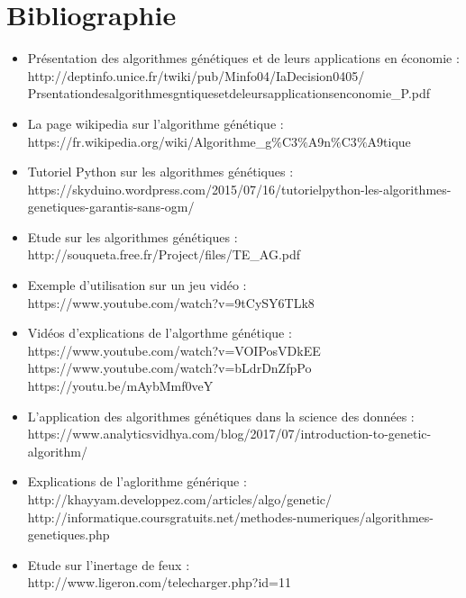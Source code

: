 \documentclass[a4paper,11pt]{article}
\begin{document}
	\section{Bibliographie}
	\begin{itemize}
		\item Présentation des algorithmes génétiques et de leurs applications en économie :\\
		http://deptinfo.unice.fr/twiki/pub/Minfo04/IaDecision0405/ \\
		Prsentationdesalgorithmesgntiquesetdeleursapplicationsenconomie\_P.pdf
		\item La page wikipedia sur l'algorithme génétique : \\
		https://fr.wikipedia.org/wiki/Algorithme\_g$\%$C3$\%$A9n$\%$C3$\%$A9tique

		\item Tutoriel Python sur les algorithmes génétiques :\\
		https://skyduino.wordpress.com/2015/07/16/tutorielpython-les-algorithmes-genetiques-garantis-sans-ogm/

		\item Etude sur les algorithmes génétiques :\\
		http://souqueta.free.fr/Project/files/TE\_AG.pdf
		
		\item Exemple d'utilisation sur un jeu vidéo :\\
		https://www.youtube.com/watch?v=9tCySY6TLk8

		\item Vidéos d'explications de l'algorthme génétique :\\
		https://www.youtube.com/watch?v=VOIPosVDkEE\\
		https://www.youtube.com/watch?v=bLdrDnZfpPo\\
		https://youtu.be/mAybMmf0veY

		\item L'application des algorithmes génétiques dans la science des données :\\
		https://www.analyticsvidhya.com/blog/2017/07/introduction-to-genetic-algorithm/ 

		\item Explications de l’aglorithme générique :\\
		http://khayyam.developpez.com/articles/algo/genetic/\\
		http://informatique.coursgratuits.net/methodes-numeriques/algorithmes-genetiques.php

		\item Etude sur l'inertage de feux :\\
		http://www.ligeron.com/telecharger.php?id=11


\end{itemize}
\end{document}
